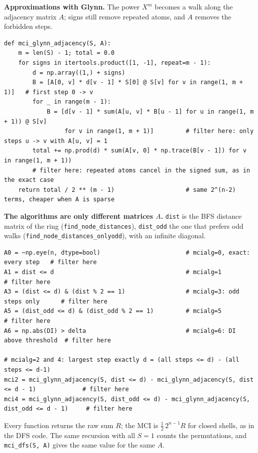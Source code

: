 \documentclass[11pt,a4paper]{article}
\begin{document}
\textbf{Approximations with Glynn.} The power $X^m$ becomes a walk along the adjacency matrix $A$; signs still remove
repeated atoms, and $A$ removes the forbidden steps.
\begin{lstlisting}
def mci_glynn_adjacency(S, A):
    m = len(S) - 1; total = 0.0
    for signs in itertools.product([1, -1], repeat=m - 1):
        d = np.array((1,) + signs)
        B = [A[0, v] * d[v - 1] * S[0] @ S[v] for v in range(1, m + 1)]   # first step 0 -> v
        for _ in range(m - 1):
            B = [d[v - 1] * sum(A[u, v] * B[u - 1] for u in range(1, m + 1)) @ S[v]
                 for v in range(1, m + 1)]         # filter here: only steps u -> v with A[u, v] = 1
        total += np.prod(d) * sum(A[v, 0] * np.trace(B[v - 1]) for v in range(1, m + 1))
        # filter here: repeated atoms cancel in the signed sum, as in the exact case
    return total / 2 ** (m - 1)                    # same 2^(n-2) terms, cheaper when A is sparse
\end{lstlisting}

\textbf{The algorithms are only different matrices $A$.} \texttt{dist} is the BFS distance matrix of the ring
(\texttt{find\_node\_distances}), \texttt{dist\_odd} the one that prefers odd walks (\texttt{find\_node\_distances\_onlyodd}),
with an infinite diagonal.
\begin{lstlisting}
A0 = ~np.eye(n, dtype=bool)                        # mcialg=0, exact: every step   # filter here
A1 = dist <= d                                     # mcialg=1                      # filter here
A3 = (dist <= d) & (dist % 2 == 1)                 # mcialg=3: odd steps only      # filter here
A5 = (dist_odd <= d) & (dist_odd % 2 == 1)         # mcialg=5                      # filter here
A6 = np.abs(DI) > delta                            # mcialg=6: DI above threshold  # filter here

# mcialg=2 and 4: largest step exactly d = (all steps <= d) - (all steps <= d-1)
mci2 = mci_glynn_adjacency(S, dist <= d) - mci_glynn_adjacency(S, dist <= d - 1)             # filter here
mci4 = mci_glynn_adjacency(S, dist_odd <= d) - mci_glynn_adjacency(S, dist_odd <= d - 1)     # filter here
\end{lstlisting}
Every function returns the raw sum $R$; the MCI is $\tfrac12\,2^{n-1}R$ for closed shells, as in the DFS code. The same
recursion with all $S=1$ counts the permutations, and \texttt{mci\_dfs(S, A)} gives the same value for the same $A$.
\end{document}
